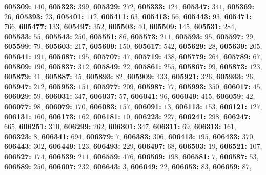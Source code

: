 \textsf{\bfseries 605309:} $140$, \textsf{\bfseries 605323:} $399$, \textsf{\bfseries 605329:} $272$, \textsf{\bfseries 605333:} $124$, \textsf{\bfseries 605347:} $341$, \textsf{\bfseries 605369:} $26$, \textsf{\bfseries 605393:} $23$, \textsf{\bfseries 605401:} $112$, \textsf{\bfseries 605411:} $63$, \textsf{\bfseries 605413:} $56$, \textsf{\bfseries 605443:} $93$, \textsf{\bfseries 605471:} $766$, \textsf{\bfseries 605477:} $133$, \textsf{\bfseries 605497:} $352$, \textsf{\bfseries 605503:} $40$, \textsf{\bfseries 605509:} $145$, \textsf{\bfseries 605531:} $284$, \textsf{\bfseries 605533:} $55$, \textsf{\bfseries 605543:} $250$, \textsf{\bfseries 605551:} $86$, \textsf{\bfseries 605573:} $211$, \textsf{\bfseries 605593:} $95$, \textsf{\bfseries 605597:} $29$, \textsf{\bfseries 605599:} $79$, \textsf{\bfseries 605603:} $217$, \textsf{\bfseries 605609:} $150$, \textsf{\bfseries 605617:} $542$, \textsf{\bfseries 605629:} $28$, \textsf{\bfseries 605639:} $205$, \textsf{\bfseries 605641:} $191$, \textsf{\bfseries 605687:} $195$, \textsf{\bfseries 605707:} $47$, \textsf{\bfseries 605719:} $438$, \textsf{\bfseries 605779:} $264$, \textsf{\bfseries 605789:} $67$, \textsf{\bfseries 605809:} $190$, \textsf{\bfseries 605837:} $312$, \textsf{\bfseries 605849:} $22$, \textsf{\bfseries 605861:} $255$, \textsf{\bfseries 605867:} $99$, \textsf{\bfseries 605873:} $123$, \textsf{\bfseries 605879:} $41$, \textsf{\bfseries 605887:} $45$, \textsf{\bfseries 605893:} $82$, \textsf{\bfseries 605909:} $433$, \textsf{\bfseries 605921:} $326$, \textsf{\bfseries 605933:} $26$, \textsf{\bfseries 605947:} $212$, \textsf{\bfseries 605953:} $151$, \textsf{\bfseries 605977:} $209$, \textsf{\bfseries 605987:} $77$, \textsf{\bfseries 605993:} $350$, \textsf{\bfseries 606017:} $45$, \textsf{\bfseries 606029:} $59$, \textsf{\bfseries 606031:} $347$, \textsf{\bfseries 606037:} $57$, \textsf{\bfseries 606041:} $96$, \textsf{\bfseries 606049:} $415$, \textsf{\bfseries 606059:} $42$, \textsf{\bfseries 606077:} $98$, \textsf{\bfseries 606079:} $170$, \textsf{\bfseries 606083:} $157$, \textsf{\bfseries 606091:} $13$, \textsf{\bfseries 606113:} $153$, \textsf{\bfseries 606121:} $127$, \textsf{\bfseries 606131:} $160$, \textsf{\bfseries 606173:} $162$, \textsf{\bfseries 606181:} $10$, \textsf{\bfseries 606223:} $227$, \textsf{\bfseries 606241:} $298$, \textsf{\bfseries 606247:} $665$, \textsf{\bfseries 606251:} $310$, \textsf{\bfseries 606299:} $262$, \textsf{\bfseries 606301:} $347$, \textsf{\bfseries 606311:} $69$, \textsf{\bfseries 606313:} $161$, \textsf{\bfseries 606323:} $8$, \textsf{\bfseries 606341:} $694$, \textsf{\bfseries 606379:} $7$, \textsf{\bfseries 606383:} $306$, \textsf{\bfseries 606413:} $195$, \textsf{\bfseries 606433:} $370$, \textsf{\bfseries 606443:} $302$, \textsf{\bfseries 606449:} $123$, \textsf{\bfseries 606493:} $229$, \textsf{\bfseries 606497:} $68$, \textsf{\bfseries 606503:} $19$, \textsf{\bfseries 606521:} $107$, \textsf{\bfseries 606527:} $174$, \textsf{\bfseries 606539:} $211$, \textsf{\bfseries 606559:} $476$, \textsf{\bfseries 606569:} $198$, \textsf{\bfseries 606581:} $7$, \textsf{\bfseries 606587:} $53$, \textsf{\bfseries 606589:} $250$, \textsf{\bfseries 606607:} $232$, \textsf{\bfseries 606643:} $3$, \textsf{\bfseries 606649:} $22$, \textsf{\bfseries 606653:} $83$, \textsf{\bfseries 606659:} $87$, 
